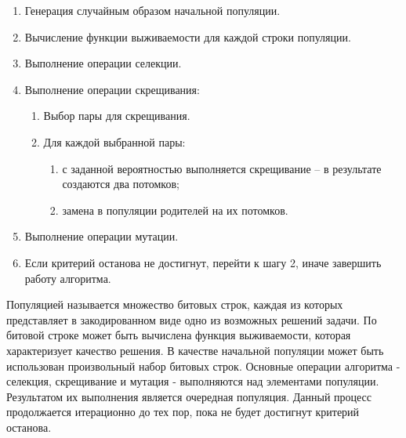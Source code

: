 \documentclass{article}
\begin{document}
\begin{enumerate}
  \item Генерация случайным образом начальной популяции.
  \item Вычисление функции выживаемости для каждой строки популяции.
  \item Выполнение операции селекции.
  \item Выполнение операции скрещивания:
        \begin{enumerate}
          \item Выбор пары для скрещивания.
          \item Для каждой выбранной пары:
                \begin{enumerate}
                  \item с заданной вероятностью выполняется скрещивание – в результате создаются два потомков;
                  \item замена в популяции родителей на их потомков.
                \end{enumerate}
        \end{enumerate}
  \item Выполнение операции мутации.
  \item Если критерий останова не достигнут, перейти к шагу 2, иначе завершить работу алгоритма.
\end{enumerate}
Популяцией называется множество битовых строк, каждая из которых представляет в закодированном виде одно из возможных решений задачи. По битовой строке может быть вычислена функция выживаемости, которая характеризует качество решения. В качестве начальной популяции может быть использован произвольный набор битовых строк. Основные операции алгоритма - селекция, скрещивание и мутация - выполняются над элементами популяции. Результатом их выполнения является очередная популяция. Данный процесс продолжается итерационно до тех пор, пока не будет достигнут критерий останова.
\end{document}
